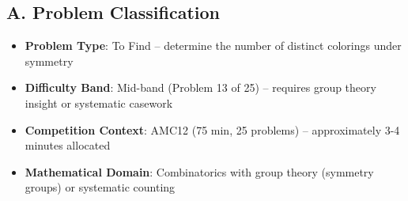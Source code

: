 \documentclass[11pt]{article}
\begin{document}
\begin{problemconfigbox}
\subsection*{A. Problem Classification}
\begin{itemize}[leftmargin=*]
    \item \textbf{Problem Type}: To Find -- determine the number of distinct colorings under symmetry
    \item \textbf{Difficulty Band}: Mid-band (Problem 13 of 25) -- requires group theory insight or systematic casework
    \item \textbf{Competition Context}: AMC12 (75 min, 25 problems) -- approximately 3-4 minutes allocated
    \item \textbf{Mathematical Domain}: Combinatorics with group theory (symmetry groups) or systematic counting
\end{itemize}


\end{problemconfigbox}
\end{document}
